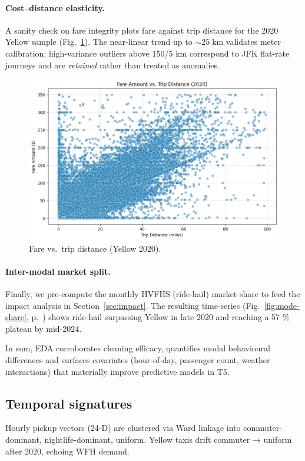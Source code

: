 \documentclass[conference]{IEEEtran}
\begin{document}
\paragraph*{Cost–distance elasticity.}
A sanity check on fare integrity plots fare against trip distance for the 2020
Yellow sample (Fig.~\ref{fig:fare-vs-dist}).  The near-linear trend up to
\(\sim\!25\;\mathrm{km}\) validates meter calibration; high-variance outliers
above 150/5 km correspond to JFK flat-rate journeys and are \emph{retained}
rather than treated as anomalies.

\begin{figure}[htbp]
  \centering
  \includegraphics[width=0.9\linewidth]{fare_vs_distance.png}
  \caption{Fare vs.\ trip distance (Yellow 2020).}
  \label{fig:fare-vs-dist}
\end{figure}

\paragraph*{Inter-modal market split.}
Finally, we pre-compute the monthly HVFHS (ride-hail) market share to feed the
impact analysis in Section~\ref{sec:impact}.  The resulting time-series
(Fig.~\ref{fig:mode-share}, p.~\pageref{fig:mode-share}) shows ride-hail
surpassing Yellow in late 2020 and reaching a 57 \% plateau by mid-2024.

\vspace{0.5em}
In sum, EDA corroborates cleaning efficacy, quantifies modal behavioural
differences and surfaces covariates (hour-of-day, passenger count, weather
interactions) that materially improve predictive models in T5.


\subsection{Temporal signatures}
Hourly pickup vectors (24-D) are clustered via Ward linkage into
commuter-dominant, nightlife-dominant, uniform.  
Yellow taxis drift commuter → uniform after 2020, echoing WFH demand.
\end{document}
